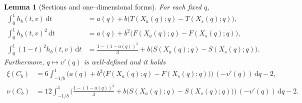 \documentclass{article}
\newtheorem{lemma}[theorem]{Lemma}
\newcommand{\1}{\mathds{1}}
\newcommand{\de}{\mathrm{\,d}}
\begin{document}
\begin{lemma}[Sections and one–dimensional forms]\label{lem:1D}
For each fixed $q$,
\begin{align}
\int_0^1 h_b(t,v)\de t
&= a(q)+b\big(T(X_a(q);q)-T(X_s(q);q)\big),\label{eq:marg-1D}\\
\int_0^1 h_b(t,v)^2\de t
&= a(q)+b^2\big(F(X_a(q);q)-F(X_s(q);q)\big),\label{eq:sq-1D}\\
\int_0^1 (1-t)^2 h_b(t,v)\de t
&= \frac{1-(1-a(q))^3}{3}+b\big(S(X_a(q);q)-S(X_s(q);q)\big).\label{eq:wgt-1D}
\end{align}
Furthermore, $q\mapsto v'(q)$ is well-defined and it holds
\begin{align}
\xi(C_b)&=6\!\!\int_{-1/b}^{1}\!\!\Big(a(q)+b^2\big(F(X_a(q);q)-F(X_s(q);q)\big)\Big)\,(-v'(q))\de q-2,\label{eq:xi-1D}\\
\nu(C_b)&=12\!\!\int_{-1/b}^{1}\!\!\Big(\frac{1-(1-a(q))^3}{3}+b\big(S(X_a(q);q)-S(X_s(q);q)\big)\Big)\,(-v'(q))\de q-2.\label{eq:nu-1D}
\end{align}
\end{lemma}
\end{document}

